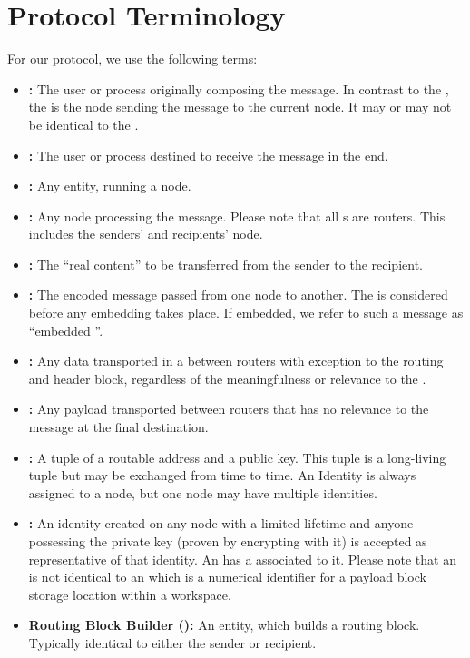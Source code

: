 \section{Protocol Terminology}
For our protocol, we use the following terms:
\begin{itemize}
	\item \textbf{:} The user or process originally composing the message. In contrast to the , the  is the node sending the message to the current node. It may or may not be identical to the .
	\item \textbf{:} The user or process destined to receive the message in the end.
	\item \textbf{:} Any entity, running a \MessageVortex{} node.
	\item \textbf{:} Any node processing the message. Please note that all \VortexNode{}s are routers. This includes the senders' and recipients' node.
	\item \textbf{:} The ``real content'' to be transferred from the sender to the recipient.    
	\item \textbf{:} The encoded message passed from one node to another. The \VortexMessage{} is considered before any embedding takes place. If embedded, we refer to such a message as ``embedded \VortexMessage''.
	\item \textbf{:} Any data transported in a \VortexMessage{} between routers with exception to the routing and header block, regardless of the meaningfulness or relevance to the \VortexMessage.
	\item \textbf{:} Any payload transported between routers that has no relevance to the message at the final destination.
	\item \textbf{:} A tuple of a routable address and a public key. This tuple is a long-living tuple but may be exchanged from time to time. An Identity is always assigned to a node, but one node may have multiple identities. 
	\item \textbf{:} An identity created on any node with a limited lifetime and anyone possessing the private key (proven by encrypting with it) is accepted as representative of that identity. An  has a  associated to it. Please note that an  is not identical to an  which is a numerical identifier for a payload block storage location within a workspace.
	\item \textbf{Routing Block Builder ():} An entity, which builds a routing block. Typically identical to either the sender or recipient.
\end{itemize}

